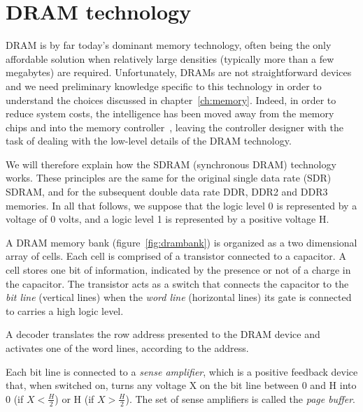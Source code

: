 \documentclass[a4paper,11pt]{kthesis}
\begin{document}
\section{DRAM technology}
DRAM is by far today's dominant memory technology, often being the only affordable solution when relatively large densities (typically more than a few megabytes) are required. Unfortunately, DRAMs are not straightforward devices and we need preliminary knowledge specific to this technology in order to understand the choices discussed in chapter~\ref{ch:memory}. Indeed, in order to reduce system costs, the intelligence has been moved away from the memory chips and into the memory controller~\cite{dramlowcost}, leaving the controller designer with the task of dealing with the low-level details of the DRAM technology.

We will therefore explain how the SDRAM (synchronous DRAM) technology works. These principles are the same for the original single data rate (SDR) SDRAM, and for the subsequent double data rate DDR, DDR2 and DDR3 memories. In all that follows, we suppose that the logic level 0 is represented by a voltage of 0 volts, and a logic level 1 is represented by a positive voltage H.

A DRAM memory bank (figure~\ref{fig:drambank}) is organized as a two dimensional array of cells. Each cell is comprised of a transistor connected to a capacitor. A cell stores one bit of information, indicated by the presence or not of a charge in the capacitor. The transistor acts as a switch that connects the capacitor to the \textit{bit line} (vertical lines) when the \textit{word line} (horizontal lines) its gate is connected to carries a high logic level.

A decoder translates the row address presented to the DRAM device and activates one of the word lines, according to the address.

Each bit line is connected to a \textit{sense amplifier}, which is a positive feedback device that, when switched on, turns any voltage X on the bit line between 0 and H into 0 (if $X < \frac{H}{2}$) or H (if $X > \frac{H}{2}$). The set of sense amplifiers is called the \textit{page buffer}.
\end{document}
